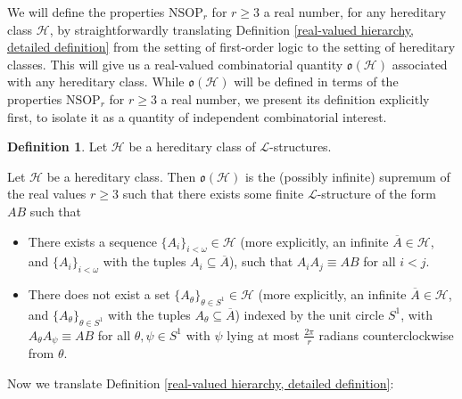 \documentclass{amsart}
\theoremstyle{definition}
\newtheorem{definition}[theorem]{Definition}
\theoremstyle{remark}
\numberwithin{equation}{section}
\begin{document}
We will define the properties $\mathrm{NSOP}_{r}$ for $r \geq 3$ a real number, for any hereditary class $\mathcal{H}$, by straightforwardly translating Definition \ref{real-valued hierarchy, detailed definition} from the setting of first-order logic to the setting of hereditary classes. This will give us a real-valued combinatorial quantity $\mathfrak{o}(\mathcal{H})$ associated with any hereditary class. While $\mathfrak{o}(\mathcal{H})$ will be defined in terms of the properties $\mathrm{NSOP}_{r}$ for $r \geq 3$ a real number, we present its definition explicitly first, to isolate it as a quantity of independent combinatorial interest.

\begin{definition}\label{real value of a hereditary class}
Let $\mathcal{H}$ be a hereditary class of $\mathcal{L}$-structures.

        Let $\mathcal{H}$ be a hereditary class. Then $\mathfrak{o}(\mathcal{H})$ is the (possibly infinite) supremum of the real values $r \geq 3$ such that there exists some finite $\mathcal{L}$-structure of the form $AB$ such that

    \begin{itemize}
        \item There exists a sequence $\{ A_{i}\}_{i < \omega} \in \mathcal{H}$ (more explicitly, an infinite $\overline{A} \in \mathcal{H}$, and $\{ A_{i}\}_{i < \omega}$ with the tuples $A_{i} \subseteq \overline{A}$), such that $A_{i}A_{j} \equiv AB$ for all $i < j$.
        \item There does not exist a set $\{ A_{\theta}\}_{\theta \in S^{1}} \in \mathcal{H}$ (more explicitly, an infinite $\overline{A} \in \mathcal{H}$, and $\{ A_{\theta}\}_{\theta \in S^{1}}$ with the tuples $A_{\theta} \subseteq \overline{A}$) indexed by the unit circle $S^{1}$, with $A_{\theta}A_{\psi} \equiv AB$ for all $\theta, \psi \in S^{1}$ with $\psi$ lying at most $\frac{2\pi}{r}$ radians counterclockwise from $\theta$.
    \end{itemize}
\end{definition}

Now we translate Definition \ref{real-valued hierarchy, detailed definition}:
\end{document}

